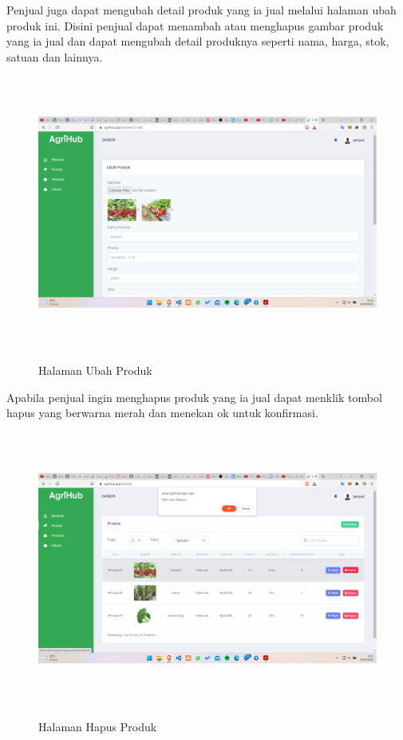 \begin{enumerate}
\begin{enumerate}
			\par Penjual juga dapat mengubah detail produk yang ia jual melalui halaman ubah produk ini. Disini penjual dapat menambah atau menghapus gambar produk yang ia jual dan dapat mengubah detail produknya seperti nama, harga, stok, satuan dan lainnya.

			\begin{figure}[H]
				\centering
				{\includegraphics [width = 14.3cm, height= 9cm]{gambar/penjual/ubah_produk}}
				\caption{Halaman Ubah Produk}
				\label{ubah_produk}
			\end{figure}

			\par Apabila penjual ingin menghapus produk yang ia jual dapat menklik tombol hapus yang berwarna merah dan menekan ok untuk konfirmasi.

			\begin{figure}[H]
				\centering
				{\includegraphics [width = 14.3cm, height= 9cm]{gambar/penjual/hapus_produk}}
				\caption{Halaman Hapus Produk}
				\label{hapus_produk}
			\end{figure}


\end{enumerate}
\end{enumerate}
